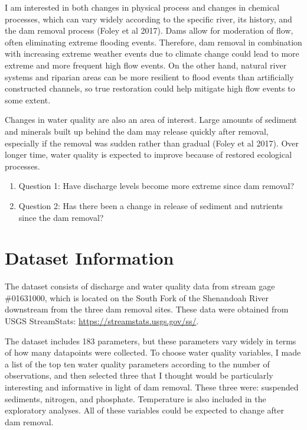 \documentclass[
  12pt,
]{article}
\begin{document}
I am interested in both changes in physical process and changes in
chemical processes, which can vary widely according to the specific
river, its history, and the dam removal process (Foley et al 2017). Dams
allow for moderation of flow, often eliminating extreme flooding events.
Therefore, dam removal in combination with increasing extreme weather
events due to climate change could lead to more extreme and more
frequent high flow events. On the other hand, natural river systems and
riparian areas can be more resilient to flood events than artificially
constructed channels, so true restoration could help mitigate high flow
events to some extent.

Changes in water quality are also an area of interest. Large amounts of
sediment and minerals built up behind the dam may release quickly after
removal, especially if the removal was sudden rather than gradual (Foley
et al 2017). Over longer time, water quality is expected to improve
because of restored ecological processes.

\begin{enumerate}
\def\labelenumi{\arabic{enumi}.}
\item
  Question 1: Have discharge levels become more extreme since dam
  removal?
\item
  Question 2: Has there been a change in release of sediment and
  nutrients since the dam removal?
\end{enumerate}

\newpage

\hypertarget{dataset-information}{%
\section{Dataset Information}\label{dataset-information}}

The dataset consists of discharge and water quality data from stream
gage \#01631000, which is located on the South Fork of the Shenandoah
River downstream from the three dam removal sites. These data were
obtained from USGS StreamStats: \url{https://streamstats.usgs.gov/ss/}.

The dataset includes 183 parameters, but these parameters vary widely in
terms of how many datapoints were collected. To choose water quality
variables, I made a list of the top ten water quality parameters
according to the number of observations, and then selected three that I
thought would be particularly interesting and informative in light of
dam removal. These three were: suspended sediments, nitrogen, and
phosphate. Temperature is also included in the exploratory analyses. All
of these variables could be expected to change after dam removal.
\end{document}
